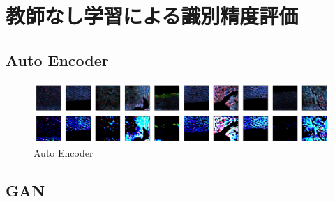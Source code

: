 \section{教師なし学習による識別精度評価}
\subsection{Auto Encoder}
\begin{figure}
	\centering
	\includegraphics[width=0.9\linewidth]{fig/chapter4/unet_ae}
	\caption{Auto Encoder}
	\label{fig:unetae}
\end{figure}

\subsection{GAN}


